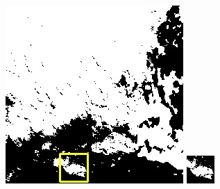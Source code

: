 \documentclass[10pt]{ctexart}
\begin{document}
\begin{multicols}{2}
\begin{figure}[H]
{\begin{minipage}[b]{0.15\linewidth}
            \includegraphics[width=1\linewidth]{../log/spoon2/cut2/LC81620432014072LGN00_16237_my.jpg}\vspace{4pt}
            \includegraphics[width=1\linewidth]{../log/spoon2/cut2/tmp_cut_LC81620432014072LGN00_16237_my.jpg}\vspace{4pt}

\end{minipage}}
\end{figure}
\end{multicols}
\end{document}
